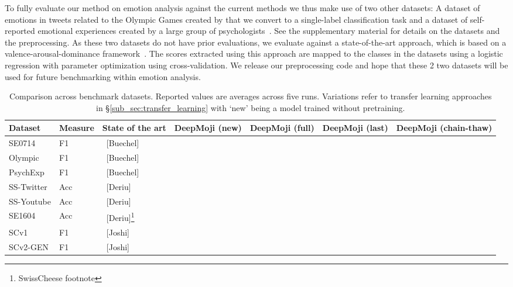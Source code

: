 \documentclass[11pt,a4paper]{article}
\begin{document}
To fully evaluate our method on emotion analysis against the current methods we thus make use of two other datasets: A dataset of emotions in tweets related to the Olympic Games created by \citeauthor{sintsova2013fine} that we convert to a single-label classification task and a dataset of self-reported emotional experiences created by a large group of psychologists~\cite{wallbott1986universal}. See the supplementary material for details on the datasets and the preprocessing. As these two datasets do not have prior evaluations, we evaluate against a state-of-the-art approach, which is based on a valence-arousal-dominance framework~\cite{sven_emotions}. The scores extracted using this approach are mapped to the classes in the datasets using a logistic regression with parameter optimization using cross-validation. We release our preprocessing code and hope that these 2 two datasets will be used for future benchmarking within emotion analysis.


\begin{table*}[h]
\centering
\small
\caption{Comparison across benchmark datasets. Reported values are averages across five runs. Variations refer to transfer learning approaches in \S\ref{sub_sec:transfer_learning} with `new' being a model trained without pretraining.}
\label{tab:benchmark_results}
\begin{center}
\begin{tabular}{lC{1.5cm}L{2.1cm}C{1.8cm}C{1.8cm}C{1.8cm}C{1.8cm}}
\toprule
Dataset & Measure & State of the art & DeepMoji (new) & DeepMoji (full) & DeepMoji (last) & DeepMoji (chain-thaw)\\
\midrule
 SE0714  &  F1 & ~[Buechel] &  &  &  &  \\
 Olympic  &  F1 & ~[Buechel] &  &  &  &  \\
 PsychExp  & F1 & ~[Buechel] &  &  &  &  \\
\midrule
 SS-Twitter  & Acc & ~[Deriu] &  &  &  &  \\  SS-Youtube  & Acc & ~[Deriu] &  &  &  &  \\ 
 SE1604  & Acc & ~[Deriu]\footnote{SwissCheese footnote} &  &  &  &  \\ 
 \midrule
 SCv1  & F1 & ~[Joshi] &  &  &  &  \\  SCv2-GEN  & F1 & ~[Joshi] &  &  &  &  \\ \bottomrule
\end{tabular}
\end{center}
\end{table*}
\end{document}
